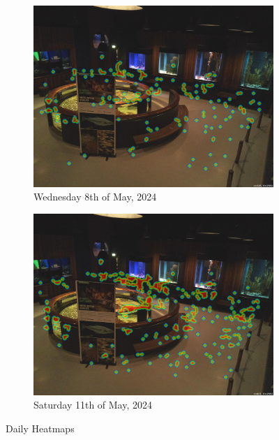 \begin{figure}[H]
    \centering
    \begin{subfigure}{0.475\textwidth}
        \centering
        \includegraphics[width=\textwidth]{Images/Analytics/heatmap_day_08052024.jpg}
        \caption{Wednesday 8th of May, 2024}
    \end{subfigure}
    \hfill
    \begin{subfigure}{0.475\textwidth}
        \centering
        \includegraphics[width=1\textwidth]{Images/Analytics/heatmap_day_11052024.jpg}
        \caption{Saturday 11th of May, 2024}
    \end{subfigure}
    \caption{Daily Heatmaps}
    \label{fig:heatmap_daily}
\end{figure}

